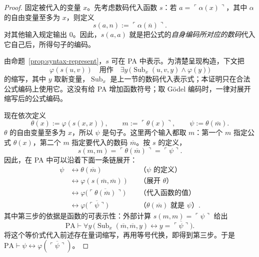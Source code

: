 \documentclass[lang=cn,a4paper,fontset=none,zihao=false,10pt,openany,twoside]{beautybook}
\numberwithin{algorithm}{chapter}
\begin{document}
\begin{proof}
固定被代入的变量 $x$。先考虑数码代入函数 $s$：若 $a=\ulcorner\alpha(x)\urcorner$，其中 $\alpha$ 的自由变量至多为 $x$，则定义
\[
 s(a,n):=\ulcorner\alpha(\overline n)\urcorner.
\]
对其他输入规定输出 $0$。因此，$s(a,a)$ 就是把公式的\emph{自身编码所对应的数码}代入它自己后，所得句子的编码。

由命题~\ref{prop:syntax-represent}，$s$ 可在 PA 中表示。为清楚呈现构造，下文把
\[
 \varphi(s(u,v))
 \quad\text{用作}\quad
 \exists y\,\bigl(\operatorname{Sub}_x(u,v,y)\wedge\varphi(y)\bigr)
\]
的缩写，其中 $y$ 取新变量，$\operatorname{Sub}_x$ 是上一节的数码代入表示式；本证明只在合法公式编码上使用它。这没有给 PA 增加函数符号；取 Gödel 编码时，一律对展开缩写后的公式编码。

现在依次定义
\[
 \theta(x):=\varphi(s(x,x)),\qquad
 m:=\ulcorner\theta(x)\urcorner,\qquad
 \psi:=\theta(\overline m).
\]
$\theta$ 的自由变量至多为 $x$，所以 $\psi$ 是句子。这里两个输入都取 $m$：第一个 $m$ 指定公式 $\theta(x)$，第二个 $m$ 指定要代入的数码 $\overline m$。按 $s$ 的定义，
\[
 s(m,m)=\ulcorner\theta(\overline m)\urcorner
       =\ulcorner\psi\urcorner.
\]
因此，在 PA 中可以沿着下面一条链展开：
\[
 \begin{aligned}
 \psi
 &\leftrightarrow\theta(\overline m)
 &&\text{（$\psi$ 的定义）}\\
 &\leftrightarrow\varphi(s(\overline m,\overline m))
 &&\text{（展开 $\theta$）}\\
 &\leftrightarrow\varphi\bigl(\overline{\ulcorner\theta(\overline m)\urcorner}\bigr)
 &&\text{（代入函数的值）}\\
 &\leftrightarrow\varphi\bigl(\overline{\ulcorner\psi\urcorner}\bigr)
 &&\text{（$\theta(\overline m)$ 就是 $\psi$）}.
 \end{aligned}
\]
其中第三步的依据是函数的可表示性：外部计算 $s(m,m)=\ulcorner\psi\urcorner$ 给出
\[
 \mathrm{PA}\vdash\forall y\,
 \bigl(\operatorname{Sub}_x(\overline m,\overline m,y)
 \leftrightarrow y=\overline{\ulcorner\psi\urcorner}\bigr).
\]
将这个等价式代入前述存在量词缩写，再用等号代换，即得到第三步。于是
$\mathrm{PA}\vdash\psi\leftrightarrow\varphi(\overline{\ulcorner\psi\urcorner})$。
\end{proof}
\end{document}
